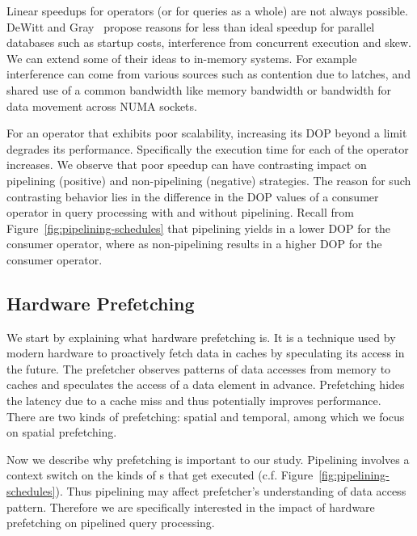Linear speedups for operators (or for queries as a whole) are not always possible.
DeWitt and Gray~\cite{DBLP:journals/cacm/DeWittG92} propose reasons for less than ideal speedup for parallel databases such as startup costs, interference from concurrent execution and skew.
We can extend some of their ideas to in-memory systems.
For example interference can come from various sources such as contention due to latches, and shared use of a common bandwidth like memory bandwidth or bandwidth for data movement across NUMA sockets.

For an operator that exhibits poor scalability, increasing its DOP beyond a limit degrades its performance.
Specifically the execution time for each \wo{} of the operator increases. 
We observe that poor speedup can have contrasting impact on pipelining (positive) and non-pipelining (negative) strategies.
The reason for such contrasting behavior lies in the difference in the DOP values of a consumer operator in query processing with and without pipelining.
Recall from Figure~\ref{fig:pipelining-schedules} that pipelining yields in a lower DOP for the consumer operator, where as non-pipelining results in a higher DOP for the consumer operator.

\subsection{Hardware Prefetching}
We start by explaining what hardware prefetching is. 
It is a technique used by modern hardware to proactively fetch data in caches by speculating its access in the future.
The prefetcher observes patterns of data accesses from memory to caches and speculates the access of a data element in advance.
Prefetching hides the latency due to a cache miss and thus potentially improves performance.
There are two kinds of prefetching: spatial and temporal, among which we focus on spatial prefetching. 

Now we describe why prefetching is important to our study. 
Pipelining involves a context switch on the kinds of \wo{}s that get executed (c.f. Figure~\ref{fig:pipelining-schedules}).
Thus pipelining may affect prefetcher's understanding of data access pattern. 
Therefore we are specifically interested in the impact of hardware prefetching on pipelined query processing. 

